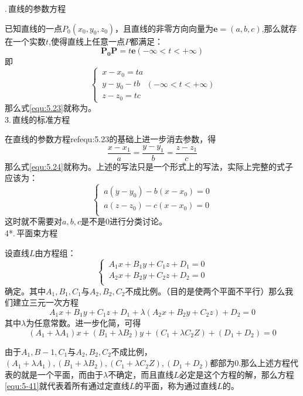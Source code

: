 .$\,$直线的参数方程
\par 已知直线的一点$P_0(x_0,y_0,z_0)$，且直线的非零方向向量为$\boldsymbol{e}=(a,b,c)$,那么就存在一个实数$t$,使得直线上任意一点$P$都满足：
\begin{equation}
	\boldsymbol{P_0P}=t\boldsymbol{e}(-\infty<t<+\infty)
\end{equation}
即
\begin{equation}
	\begin{cases}
		\, x-x_0=ta\\
		\, y-y_0-tb\\
		\, z-z_0=tc
	\end{cases}
(-\infty<t<+\infty)
\label{equ:5.23}
\end{equation}
那么式\eqref{equ:5.23}就称为。
\\ 3.$\,$直线的标准方程
\par 在直线的参数方程ref{equ:5.23}的基础上进一步消去参数，得
\begin{equation}
	\frac{x-x_1}{a}=\frac{y-y_1}{b}=\frac{z-z_1}{c}
\label{equ:5.24}
\end{equation}
那么式\eqref{equ:5.24}就称为。上述的写法只是一个形式上的写法，实际上完整的式子应该为：
\begin{equation}
	\begin{cases}
		\, a(y-y_0)-b(x-x_0)=0\\
		\, a(z-z_0)-c(x-x_0)=0\\
	\end{cases}
\end{equation}
这时就不需要对$a,b,c$是不是0进行分类讨论。
\\ 4*.$\,$平面束方程
\par 设直线$L$由方程组：
\begin{equation}
	\begin{cases}
\, A_1x+B_1y+C_1z+D_1=0\\
\, A_2x+B_2y+C_2z+D_2=0\\
\end{cases}
\end{equation}
确定。其中$A_1,B_1,C_1$与$A_2,B_2,C_2$不成比例。（目的是使两个平面不平行）那么我们建立三元一次方程
\begin{equation}
	A_1x+B_1y+C_1z+D_1+\lambda(A_2x+B_2y+C_2z)+D_2=0
\label{equ:5-41}	
\end{equation}
其中$\lambda$为任意常数。进一步化简，可得
\begin{equation}
	(A_1+\lambda A_1)x+(B_1+\lambda B_2)y+(C_1+\lambda C_2Z)+(D_1+D_2)=0
\end{equation}
\par 由于$A_1,B-1,C_1$与$A_2,B_2,C_2$不成比例，$(A_1+\lambda A_1),(B_1+\lambda B_2),(C_1+\lambda C_2Z),(D_1+D_2)$都部为0.那么上述方程代表的就是一个平面，而由于$\lambda$不确定，而且直线$L$必定是这个方程的解，那么方程\eqref{equ:5-41}就代表着所有通过定直线$L$的平面，称为通过直线$L$的。

